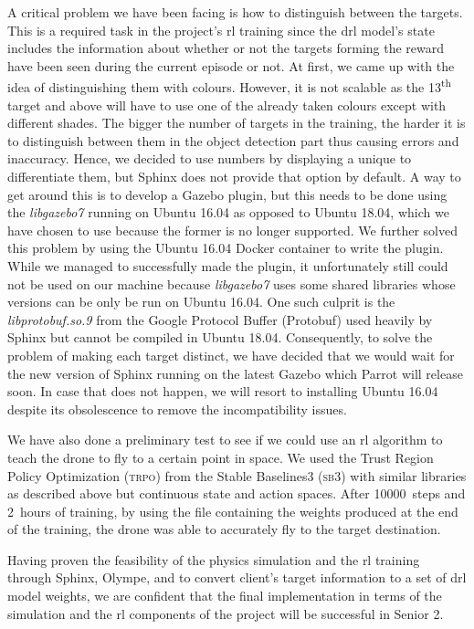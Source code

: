 \documentclass[../main.tex]{subfiles}
\begin{document}
A critical problem we have been facing 
is how to distinguish
between the targets. This is a required task in the
project's \gls{rl} training since 
the \gls{drl} model's state
includes the information about whether or not
the targets forming the reward have been seen 
during the current episode or not. 
At first, we came up with the idea of distinguishing them
with colours. However, it is not scalable 
as the 13\textsuperscript{th}
target and above will have to use 
one of the already taken colours
except with different shades. The bigger the number of
targets in the training, the harder it is to
distinguish between them in the object detection part
thus causing errors and inaccuracy. Hence, we decided
to use numbers by displaying a unique \id
to differentiate them, but
Sphinx does not provide that option by default.
A way to get around this is to develop a Gazebo plugin,
but this needs to be done using the \textit{libgazebo7} running
on Ubuntu 16.04 as opposed to Ubuntu 18.04, which we 
have chosen to use because the former 
is no longer supported.
We further solved this problem by using the Ubuntu 16.04
Docker container to write the plugin. While we managed
to successfully made the plugin, it unfortunately still
could not be used on our machine because \textit{libgazebo7}
uses some shared libraries whose versions can be only 
be run on Ubuntu 16.04. One such culprit is the 
\textit{libprotobuf.so.9} from the Google Protocol Buffer 
(Protobuf) used heavily by Sphinx but cannot be compiled
in Ubuntu 18.04. Consequently, 
to solve the problem of making each target distinct, 
we have decided that we would wait for the new
version of Sphinx running on the latest Gazebo
which Parrot will release soon. In case that does
not happen,
we will resort to installing Ubuntu 16.04 despite its
obsolescence to remove the incompatibility issues.

We have also done a preliminary test to see if
we could use an \gls{rl} algorithm
to teach the \anafi drone to fly to a certain
point in space. We used the Trust Region Policy
Optimization (\textsc{trpo}) from the Stable
Baselines3 (\textsc{sb}3) with similar libraries
as described above but continuous state and action spaces.
After \SI{10000}{steps} and \SI{2}{hours}
of training, by using the file containing the weights 
produced at the end of the training,
the drone was able to accurately
fly to the target destination. 

Having proven the feasibility of the physics simulation
and the \gls{rl} training through Sphinx, Olympe, and \gym
to convert client's target information to
a set of \gls{drl} model weights, 
we are confident that the final implementation 
in terms of the simulation and the \gls{rl} components
of the project will be successful in Senior 2.
\end{document}

